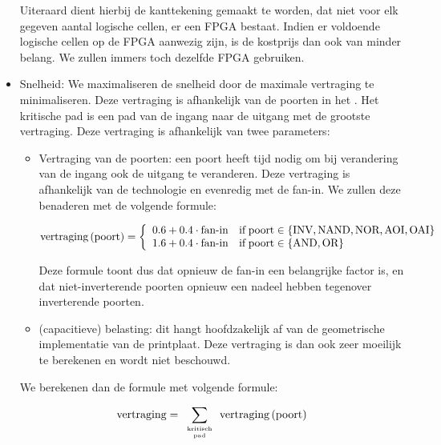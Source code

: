 \begin{itemize}
Uiteraard dient hierbij de kanttekening gemaakt te worden, dat niet voor elk gegeven aantal logische cellen, er een FPGA bestaat. Indien er voldoende logische cellen op de FPGA aanwezig zijn, is de kostprijs dan ook van minder belang. We zullen immers toch dezelfde FPGA gebruiken.
\item Snelheid: We maximaliseren de snelheid door de maximale vertraging te minimaliseren. Deze vertraging is afhankelijk van de poorten in het . Het kritische pad is een pad van de ingang naar de uitgang met de grootste vertraging. Deze vertraging is afhankelijk van twee parameters:
\begin{itemize}
\item Vertraging van de poorten: een poort heeft tijd nodig om bij verandering van de ingang ook de uitgang te veranderen. Deze vertraging is afhankelijk van de technologie en evenredig met de fan-in. We zullen deze benaderen met de volgende formule:

\begin{equation}
\funm{vertraging}{\mbox{poort}}=\acclguard{
0.6+0.4\cdot\mbox{fan-in}&\mbox{if}\;\mbox{poort}\in\accl{\mbox{INV},\mbox{NAND},\mbox{NOR},\mbox{AOI},\mbox{OAI}}\\
1.6+0.4\cdot\mbox{fan-in}&\mbox{if}\;\mbox{poort}\in\accl{\mbox{AND},\mbox{OR}}
}
\eqnlab{speedPoort}
\end{equation}

Deze formule toont dus dat opnieuw de fan-in een belangrijke factor is, en dat niet-inverterende poorten opnieuw een nadeel hebben tegenover inverterende poorten.
\item (capacitieve) belasting: dit hangt hoofdzakelijk af van de geometrische implementatie van de printplaat. Deze vertraging is dan ook zeer moeilijk te berekenen en wordt niet beschouwd.
\end{itemize}

We berekenen dan de formule met volgende formule:

\begin{equation}
\mbox{vertraging}=\displaystyle\sum_{\tiny\begin{array}{c}\mbox{kritisch}\\\mbox{pad}\end{array}}{\funm{vertraging}{\mbox{poort}}}
\eqnlab{speed}
\end{equation}

\end{itemize}

